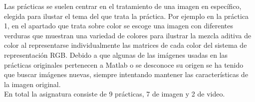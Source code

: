 \documentclass[a4paper,12pt]{report}
\begin{document}
Las prácticas se suelen centrar en el tratamiento de una imagen en específico, elegida para ilustar el tema del que trata la práctica. Por ejemplo en la práctica 1, en el apartado que trata sobre color se escoge una imagen con diferentes verduras que muestran una variedad de colores para ilustrar la mezcla aditiva de color al representarse individualmente las matrices de cada color del sistema de representación RGB. Debido a que algunas de las imágenes usadas en las prácticas originales pertenecen a Matlab o se desconoce su origen se ha tenido que buscar imágenes nuevas, siempre intentando mantener las características de la imagen original.\\

En total la asignatura consiste de 9 prácticas, 7 de imagen y 2 de video. \\
\end{document}
